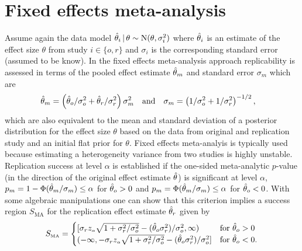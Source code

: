 \documentclass[a4paper, 11pt]{article}
\begin{document}
\section{Fixed effects meta-analysis}
Assume again the data model
$\hat{\theta}_{i} \,\vert\, \theta \sim \operatorname{N}(\theta, \sigma^{2}_{i})$ where $\hat{\theta}_{i}$ is
an estimate of the effect size $\theta$ from study $i \in \{o, r\}$ and
$\sigma_{i}$ is the corresponding standard error (assumed to be know). In the
fixed effects meta-analysis approach replicability is assessed in terms of the
pooled effect estimate $\hat{\theta}_{m}$ and standard error $\sigma_{m}$ which are
\begin{align*}
  &\hat{\theta}_{m} =
    \left(\hat{\theta}_{o}/\sigma_{o}^{2} + \hat{\theta}_{r}/\sigma^{2}_{r}\right)\sigma^{2}_{m}&
&\text{and}&                                                                                       &\sigma_{m} = \left(1/\sigma^{2}_{o} + 1/\sigma^{2}_{r}\right)^{-1/2},&
\end{align*}
which are also equivalent to the mean and standard deviation of a posterior
distribution for the effect size $\theta$ based on the data from original and
replication study and an initial flat prior for $\theta$. Fixed effects
meta-analyis is typically used because estimating a heterogeneity variance from
two studies is highly unstable. Replication success at level $\alpha$ is
established if the one-sided meta-analytic $p$-value (in the direction of the
original effect estimate $\hat{\theta}$) is significant at level $\alpha$, \ie{}
$p_{m} = 1 - \Phi(\hat{\theta}_{m}/\sigma_{m}) \leq \alpha$ for $\hat{\theta}_{o} > 0$ and
$p_{m} = \Phi(\hat{\theta}_{m}/\sigma_{m}) \leq \alpha$ for $\hat{\theta}_{o} < 0$.
With some algebraic manipulations one can show that this criterion implies a
success region $S_{\text{MA}}$ for the replication effect estimate $\hat{\theta}_{r}$
given by
\begin{align*}
  S_{\scriptscriptstyle \text{MA}}
  =
  \begin{cases}
    [\sigma_{r} z_{\scriptscriptstyle \alpha}\sqrt{1 + \sigma^{2}_{r}/\sigma^{2}_{o}} -
      (\hat{\theta}_{o} \sigma^{2}_{r})/\sigma^{2}_{o},   \infty )
    & \text{for} ~ \hat{\theta}_{o} > 0 \\
    (-\infty, -\sigma_{r} z_{\scriptscriptstyle \alpha}\sqrt{1 + \sigma^{2}_{r}/\sigma^{2}_{o}} -
      (\hat{\theta}_{o} \sigma^{2}_{r})/\sigma^{2}_{o}]
    & \text{for} ~ \hat{\theta}_{o} < 0.
\end{cases}
\end{align*}
\end{document}
